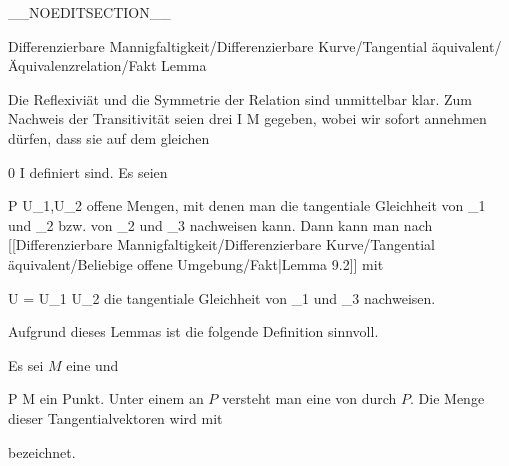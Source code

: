 __NOEDITSECTION__

{Differenzierbare Mannigfaltigkeit/Differenzierbare Kurve/Tangential äquivalent/Äquivalenzrelation/Fakt}
{Lemma}
{}
{

\faktzusatz {}
\faktzusatz {}

}
{

Die Reflexiviät und die Symmetrie der Relation sind unmittelbar klar. Zum Nachweis der Transitivität seien drei
 { I } { M
} {}
gegeben, wobei wir sofort annehmen dürfen, dass sie auf dem gleichen

\mavergleichskette
{\vergleichskette
{ 0
}
{ \in }{ I
}
{ \subseteq }{\R
}
{    }{
}
{   }{
}
}
{}{}{}
definiert sind. Es seien

\mavergleichskette
{\vergleichskette
{P
}
{ \in }{ U_1,U_2
}
{  }{
}
{    }{
}
{   }{
}
}
{}{}{}
offene Mengen, mit denen man die tangentiale Gleichheit von
\mathkor {} {\gamma_1} {und} {\gamma_2} {}
bzw. von
\mathkor {} {\gamma_2} {und} {\gamma_3} {}
nachweisen kann. Dann kann man nach
[[Differenzierbare Mannigfaltigkeit/Differenzierbare Kurve/Tangential äquivalent/Beliebige offene Umgebung/Fakt|Lemma 9.2]]
mit

\mavergleichskette
{\vergleichskette
{U
}
{ = }{ U_1 \cap U_2
}
{  }{
}
{    }{
}
{   }{
}
}
{}{}{}
die tangentiale Gleichheit von
\mathkor {} {\gamma_1} {und} {\gamma_3} {}
nachweisen.

}

Aufgrund dieses Lemmas ist die folgende Definition sinnvoll.

{}
{

Es sei $M$ eine
und

\mavergleichskette
{\vergleichskette
{ P
}
{ \in }{ M
}
{  }{
}
{    }{
}
{   }{
}
}
{}{}{}
ein Punkt. Unter einem  an $P$ versteht man eine
von
durch $P$.  Die Menge dieser Tangentialvektoren wird mit

 {  }

bezeichnet.

}

